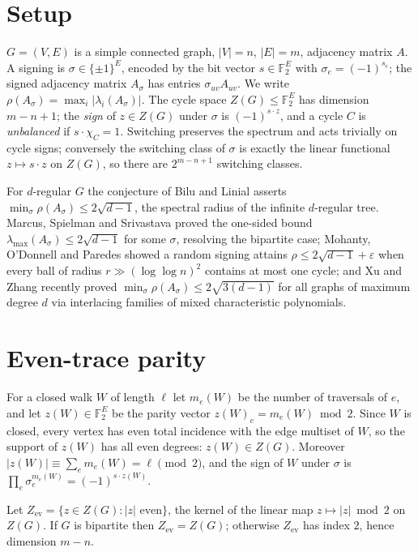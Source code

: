 \documentclass[11pt]{article}
\theoremstyle{remark}
\newcommand{\F}{\mathbb{F}}
\newcommand{\Ze}{Z_{\mathrm{ev}}}
\newcommand{\rhomax}{\rho}
\begin{document}
\section{Setup}

$G=(V,E)$ is a simple connected graph, $|V|=n$, $|E|=m$, adjacency matrix
$A$. A signing is $\sigma\in\{\pm1\}^E$, encoded by the bit vector
$s\in\F_2^E$ with $\sigma_e=(-1)^{s_e}$; the signed adjacency matrix
$A_\sigma$ has entries $\sigma_{uv}A_{uv}$. We write
$\rhomax(A_\sigma)=\max_i|\lambda_i(A_\sigma)|$. The cycle space
$Z(G)\le\F_2^E$ has dimension $m-n+1$; the \emph{sign} of $z\in Z(G)$
under $\sigma$ is $(-1)^{s\cdot z}$, and a cycle $C$ is \emph{unbalanced}
if $s\cdot\chi_C=1$. Switching preserves the spectrum and acts trivially
on cycle signs; conversely the switching class of $\sigma$ is exactly the
linear functional $z\mapsto s\cdot z$ on $Z(G)$, so there are
$2^{m-n+1}$ switching classes.

For $d$-regular $G$ the conjecture of Bilu and Linial
\cite{bilulinial06} asserts $\min_\sigma\rhomax(A_\sigma)\le
2\sqrt{d-1}$, the spectral radius of the infinite $d$-regular tree.
Marcus, Spielman and Srivastava \cite{mss15} proved the one-sided bound
$\lambda_{\max}(A_\sigma)\le2\sqrt{d-1}$ for some $\sigma$, resolving the
bipartite case; Mohanty, O'Donnell and Paredes \cite{mop20} showed a
random signing attains $\rhomax\le2\sqrt{d-1}+\varepsilon$ when every
ball of radius $r\gg(\log\log n)^2$ contains at most one cycle; and Xu
and Zhang \cite{xuzhang26} recently proved
$\min_\sigma\rhomax(A_\sigma)\le2\sqrt{3(d-1)}$ for all graphs of maximum
degree $d$ via interlacing families of mixed characteristic polynomials.

\section{Even-trace parity}

For a closed walk $W$ of length $\ell$ let $m_e(W)$ be the number of
traversals of $e$, and let $z(W)\in\F_2^E$ be the parity vector
$z(W)_e=m_e(W)\bmod 2$. Since $W$ is closed, every vertex has even total
incidence with the edge multiset of $W$, so the support of $z(W)$ has all
even degrees: $z(W)\in Z(G)$. Moreover
$|z(W)|\equiv\sum_e m_e(W)=\ell\pmod 2$, and the sign of $W$ under
$\sigma$ is $\prod_e\sigma_e^{m_e(W)}=(-1)^{s\cdot z(W)}$.

Let $\Ze=\{z\in Z(G):|z|\text{ even}\}$, the kernel of the linear map
$z\mapsto|z|\bmod2$ on $Z(G)$. If $G$ is bipartite then $\Ze=Z(G)$;
otherwise $\Ze$ has index $2$, hence dimension $m-n$.
\end{document}
